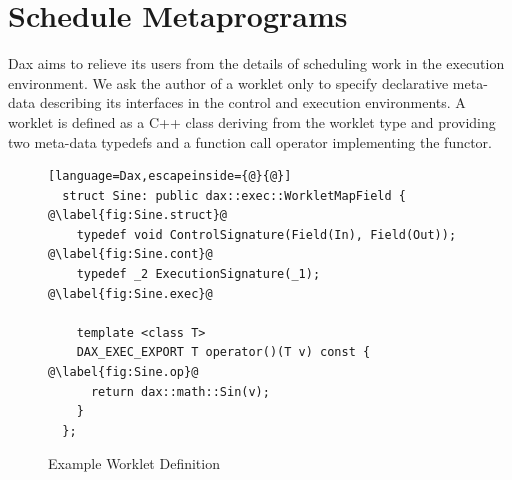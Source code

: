 \documentclass[conference]{IEEEtran}
\newcommand{\Ck}[1]{{#1}} %
\newcommand{\Ci}[1]{\color{blue}{#1}} %
\newcommand{\Cu}[1]{{\textbf{#1}}} %
\begin{document}
\section{Schedule Metaprograms}
\label{sec:ScheduleMetaprograms}

\noindent
%
Dax aims to relieve its users from the details of scheduling work in
the execution environment.
%
We ask the author of a worklet only to specify declarative meta-data
describing its interfaces in the control and execution environments.
%
A worklet is defined as a C++ class deriving from the worklet type and
providing two meta-data typedefs and a function call operator
implementing the functor.

\begin{figure}[ht]
  \centering
  \begin{lstlisting}[language=Dax,escapeinside={@}{@}]
  struct Sine: public dax::exec::WorkletMapField { @\label{fig:Sine.struct}@
    typedef void ControlSignature(Field(In), Field(Out)); @\label{fig:Sine.cont}@
    typedef _2 ExecutionSignature(_1); @\label{fig:Sine.exec}@

    template <class T>
    DAX_EXEC_EXPORT T operator()(T v) const { @\label{fig:Sine.op}@
      return dax::math::Sin(v);
    }
  };

 \end{lstlisting}
 \caption{Example Worklet Definition}
\label{fig:Sine}
\end{figure}

\end{document}
